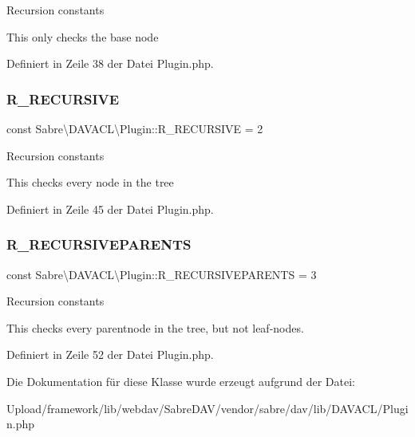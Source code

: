 Recursion constants

This only checks the base node 

Definiert in Zeile 38 der Datei Plugin.\+php.

\mbox{\label{class_sabre_1_1_d_a_v_a_c_l_1_1_plugin_a8cdab25ac96ad88a4ebdaaa8e4cc27e9}} 
\subsubsection{\texorpdfstring{R\+\_\+\+R\+E\+C\+U\+R\+S\+I\+VE}{R\_RECURSIVE}}
{\footnotesize\ttfamily const Sabre\textbackslash{}\+D\+A\+V\+A\+C\+L\textbackslash{}\+Plugin\+::\+R\+\_\+\+R\+E\+C\+U\+R\+S\+I\+VE = 2}

Recursion constants

This checks every node in the tree 

Definiert in Zeile 45 der Datei Plugin.\+php.

\mbox{\label{class_sabre_1_1_d_a_v_a_c_l_1_1_plugin_a38f164c83042d87ec5c819564dca44a9}} 
\subsubsection{\texorpdfstring{R\+\_\+\+R\+E\+C\+U\+R\+S\+I\+V\+E\+P\+A\+R\+E\+N\+TS}{R\_RECURSIVEPARENTS}}
{\footnotesize\ttfamily const Sabre\textbackslash{}\+D\+A\+V\+A\+C\+L\textbackslash{}\+Plugin\+::\+R\+\_\+\+R\+E\+C\+U\+R\+S\+I\+V\+E\+P\+A\+R\+E\+N\+TS = 3}

Recursion constants

This checks every parentnode in the tree, but not leaf-\/nodes. 

Definiert in Zeile 52 der Datei Plugin.\+php.



Die Dokumentation für diese Klasse wurde erzeugt aufgrund der Datei\+:\begin{DoxyCompactItemize}
\item 
Upload/framework/lib/webdav/\+Sabre\+D\+A\+V/vendor/sabre/dav/lib/\+D\+A\+V\+A\+C\+L/Plugin.\+php\end{DoxyCompactItemize}
